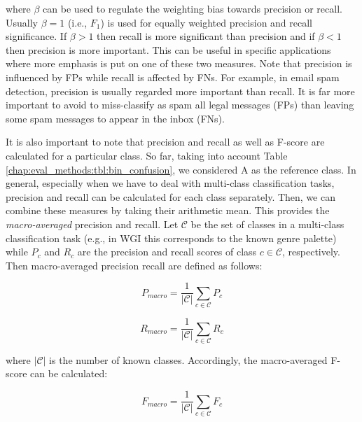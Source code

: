 \noindent
where $\beta$ can be used to regulate the weighting bias towards precision or recall. Usually $\beta = 1$ (i.e., $F_{1}$) is used for equally weighted precision and recall significance. If $\beta > 1$ then recall is more significant than precision and if $\beta < 1$ then precision is more important. This can be useful in specific applications where more emphasis is put on one of these two measures. Note that precision is influenced by FPs while recall is affected by FNs. For example, in email spam detection, precision is usually regarded more important than recall. It is far more important to avoid to miss-classify as spam all legal messages (FPs) than leaving some spam messages to appear in the inbox (FNs).

It is also important to note that precision and recall as well as F-score are calculated for a particular class. So far, taking into account Table \ref{chap:eval_methods:tbl:bin_confusion}, we considered A as the reference class. In general, especially when we have to deal with multi-class classification tasks, precision and recall can be calculated for each class separately. Then, we can combine these measures by taking their arithmetic mean. This provides the \textit{macro-averaged} precision and recall. Let $\mathcal{C}$ be the set of classes in a multi-class classification task (e.g., in WGI this corresponds to the known genre palette) while $P_c$ and $R_c$ are the precision and recall scores of class $c \in \mathcal{C}$, respectively. Then macro-averaged precision recall are defined as follows:

\begin{equation}\label{chap:eval_methods:eq:macro-precision}
	P_{macro} = \frac{1}{|\mathcal{C}|} \sum_{c \in \mathcal{C}}{P_c}
\end{equation}

\begin{equation}\label{chap:eval_methods:eq:macro-recall}
	R_{macro} = \frac{1}{|\mathcal{C}|} \sum_{c \in \mathcal{C}}{R_c}
\end{equation}

\noindent 
where $|\mathcal{C}|$ is the number of known classes. Accordingly, the macro-averaged F-score can be calculated: 

\begin{equation}\label{chap:eval_methods:eq:macro-F}
	F_{macro} = \frac{1}{|\mathcal{C}|} \sum_{c \in \mathcal{C}}{F_c}
\end{equation}

